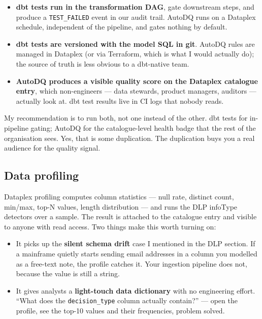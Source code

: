 \documentclass[
  11pt,
  british,
  oneside]{book}
\providecommand{\tightlist}{%
  \setlength{\itemsep}{0pt}\setlength{\parskip}{0pt}}
\begin{document}
\begin{itemize}
\tightlist
\item
  \textbf{dbt tests run in the transformation DAG}, gate downstream
  steps, and produce a \texttt{TEST\_FAILED} event in our audit trail.
  AutoDQ runs on a Dataplex schedule, independent of the pipeline, and
  gates nothing by default.
\item
  \textbf{dbt tests are versioned with the model SQL in git}. AutoDQ
  rules are managed in Dataplex (or via Terraform, which is what I would
  actually do); the source of truth is less obvious to a dbt-native
  team.
\item
  \textbf{AutoDQ produces a visible quality score on the Dataplex
  catalogue entry}, which non-engineers --- data stewards, product
  managers, auditors --- actually look at. dbt test results live in CI
  logs that nobody reads.
\end{itemize}

My recommendation is to run both, not one instead of the other. dbt
tests for in-pipeline gating; AutoDQ for the catalogue-level health
badge that the rest of the organisation sees. Yes, that is some
duplication. The duplication buys you a real audience for the quality
signal.

\hypertarget{data-profiling}{%
\subsection{Data profiling}\label{data-profiling}}

Dataplex profiling computes column statistics --- null rate, distinct
count, min/max, top-N values, length distribution --- and runs the DLP
infoType detectors over a sample. The result
is attached to the catalogue entry and visible to anyone with read
access. Two things make this worth turning on:

\begin{itemize}
\tightlist
\item
  It picks up the \textbf{silent schema drift} case I mentioned in the
  DLP section. If a mainframe quietly starts sending email addresses in
  a column you modelled as a free-text note, the profile catches it.
  Your ingestion pipeline does not, because the value is still a string.
\item
  It gives analysts a \textbf{light-touch data dictionary} with no
  engineering effort. ``What does the \texttt{decision\_type} column
  actually contain?'' --- open the profile, see the top-10 values and
  their frequencies, problem solved.
\end{itemize}
\end{document}
